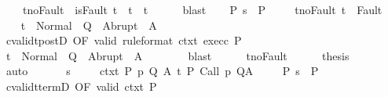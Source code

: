 \begin{isabellebody}
\ \ \ \ t{\isacharprime}{\isacharunderscore}noFault{\isacharcolon}\ {\isachardoublequoteopen}{\isasymnot}\ isFault\ t{\isacharprime}\ {\isasymlongrightarrow}\ t{\isacharprime}\ {\isacharequal}\ t{\isachardoublequoteclose}\isanewline
\ \ \ \ \isamarkupfalse%
\ blast\isanewline
\ \ \isamarkupfalse%
\ P{\isacharcolon}\ {\isachardoublequoteopen}s\ {\isasymin}\ P{\isachardoublequoteclose}\ \isanewline
\ \ \isamarkupfalse%
\ t{\isacharunderscore}noFault{\isacharcolon}\ {\isachardoublequoteopen}t\ {\isasymnotin}\ Fault\ {\isacharbackquote}\ {\isacharbraceleft}{\isacharbraceright}{\isachardoublequoteclose}\isanewline
\ \ \isamarkupfalse%
\ {\isachardoublequoteopen}t\ {\isasymin}\ Normal\ {\isacharbackquote}\ Q\ {\isasymunion}\ Abrupt\ {\isacharbackquote}\ A{\isachardoublequoteclose}\isanewline
\ \ \isamarkupfalse%
\ {\isacharminus}\isanewline
\ \ \ \ \isamarkupfalse%
\ cvalidt{\isacharunderscore}postD\ {\isacharbrackleft}OF\ valid\ {\isacharbrackleft}rule{\isacharunderscore}format{\isacharbrackright}\ ctxt\ exec{\isacharunderscore}c\ P{\isacharbrackright}\isanewline
\ \ \ \ \isamarkupfalse%
\ {\isachardoublequoteopen}t{\isacharprime}\ {\isasymin}\ Normal\ {\isacharbackquote}\ Q\ {\isasymunion}\ Abrupt\ {\isacharbackquote}\ A{\isachardoublequoteclose}\isanewline
\ \ \ \ \ \ \isamarkupfalse%
\ blast\isanewline
\ \ \ \ \isamarkupfalse%
\ t{\isacharprime}{\isacharunderscore}noFault\isanewline
\ \ \ \ \isamarkupfalse%
\ {\isacharquery}thesis\isanewline
\ \ \ \ \ \ \isamarkupfalse%
\ auto\isanewline
\ \ \isamarkupfalse%
\isanewline
{}\isamarkupfalse%
\isanewline
\ \ \isamarkupfalse%
\ s\ \isanewline
\ \ \isamarkupfalse%
\ ctxt{\isacharcolon}\ {\isachardoublequoteopen}{\isasymforall}{\isacharparenleft}P{\isacharcomma}\ p{\isacharcomma}\ Q{\isacharcomma}\ A{\isacharparenright}{\isasymin}{\isasymTheta}{\isachardot}\ {\isasymGamma}{\isasymTurnstile}\isactrlsub t\isactrlbsub {\isacharslash}{\isacharbraceleft}{\isacharbraceright}\isactrlesub \ P\ {\isacharparenleft}Call\ p{\isacharparenright}\ Q{\isacharcomma}A{\isachardoublequoteclose}\ \isanewline
\ \ \isamarkupfalse%
\ P{\isacharcolon}\ {\isachardoublequoteopen}s\ {\isasymin}\ P{\isachardoublequoteclose}\ \isanewline
\ \ \isamarkupfalse%
\ cvalidt{\isacharunderscore}termD\ {\isacharbrackleft}OF\ valid\ ctxt\ P{\isacharbrackright}\isanewline

\end{isabellebody}
